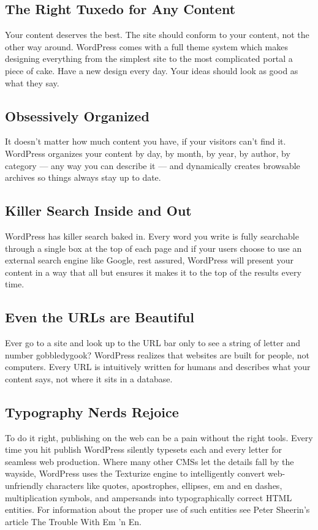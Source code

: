 \subsection{The Right Tuxedo for Any Content}

Your content deserves the best. The site should conform to your content, not the other way around. WordPress comes with a full theme system which makes designing everything from the simplest site to the most complicated portal a piece of cake. Have a new design every day. Your ideas should look as good as what they say.

\subsection{Obsessively Organized}

It doesn’t matter how much content you have, if your visitors can’t find it. WordPress organizes your content by day, by month, by year, by author, by category — any way you can describe it — and dynamically creates browsable archives so things always stay up to date.

\subsection{Killer Search Inside and Out}

WordPress has killer search baked in. Every word you write is fully searchable through a single box at the top of each page and if your users choose to use an external search engine like Google, rest assured, WordPress will present your content in a way that all but ensures it makes it to the top of the results every time.

\subsection{Even the URLs are Beautiful}

Ever go to a site and look up to the URL bar only to see a string of letter and number gobbledygook? WordPress realizes that websites are built for people, not computers. Every URL is intuitively written for humans and describes what your content says, not where it sits in a database.

\subsection{Typography Nerds Rejoice}

To do it right, publishing on the web can be a pain without the right tools. Every time you hit publish WordPress silently typesets each and every letter for seamless web production. Where many other CMSs let the details fall by the wayside, WordPress uses the Texturize engine to intelligently convert web-unfriendly characters like quotes, apostrophes, ellipses, em and en dashes, multiplication symbols, and ampersands into typographically correct HTML entities. For information about the proper use of such entities see Peter Sheerin's article The Trouble With Em ’n En.

